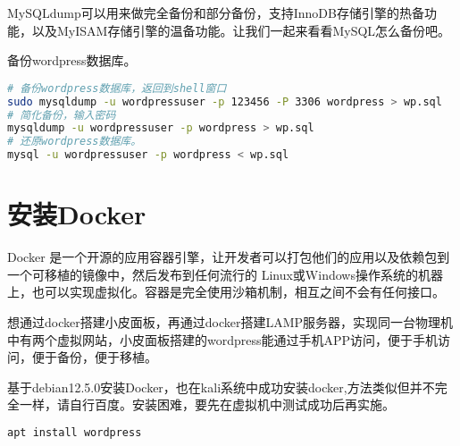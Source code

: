 \documentclass[UTF8,a4paper,12pt]{ctexbook} %
\begin{document}
MySQLdump可以用来做完全备份和部分备份，支持InnoDB存储引擎的热备功能，以及MyISAM存储引擎的温备功能。让我们一起来看看MySQL怎么备份吧。


备份wordpress数据库。
\begin{lstlisting}[language={bash}]
# 备份wordpress数据库，返回到shell窗口
sudo mysqldump -u wordpressuser -p 123456 -P 3306 wordpress > wp.sql
# 简化备份，输入密码
mysqldump -u wordpressuser -p wordpress > wp.sql
# 还原wordpress数据库。
mysql -u wordpressuser -p wordpress < wp.sql
\end{lstlisting}


\chapter{安装Docker}
Docker 是一个开源的应用容器引擎，让开发者可以打包他们的应用以及依赖包到一个可移植的镜像中，然后发布到任何流行的 Linux或Windows操作系统的机器上，也可以实现虚拟化。容器是完全使用沙箱机制，相互之间不会有任何接口。 


想通过docker搭建小皮面板，再通过docker搭建LAMP服务器，实现同一台物理机中有两个虚拟网站，小皮面板搭建的wordpress能通过手机APP访问，便于手机访问，便于备份，便于移植。


基于debian12.5.0安装Docker，也在kali系统中成功安装docker,方法类似但并不完全一样，请自行百度。安装困难，要先在虚拟机中测试成功后再实施。


\begin{lstlisting}[language={bash}]
apt install wordpress
\end{lstlisting}
\end{document}
